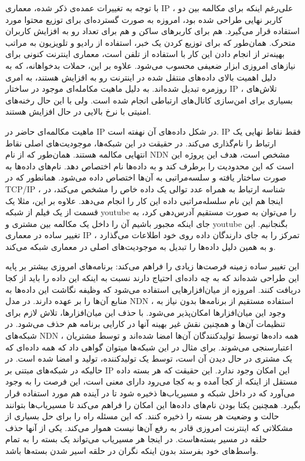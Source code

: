 با توجه به تغییرات عمده‌ی ذکر شده، معماری IP ، علی‌‌رغم اینکه برای مکالمه بین دو کاربر نهایی طراحی شده بود، امروزه به صورت گسترده‌ای برای توزیع محتوا مورد استفاده قرار می‌گیرد. هم برای کاربرهای ساکن و هم برای تعداد رو به افزایش کاربران متحرک. همان‌طور که برای توزیع کردن یک خبر، استفاده از رادیو و تلویزیون به مراتب بهینه‌تر از انجام دادن این کار با استفاده از تلفن است،  معماری اینترنت کنونی برای نیازهای امروزی ابزار ضعیفی محسوب می‌شود. علاوه بر این، حملات بدخواهانه، که به دلیل اهمیت بالای داده‌های منتقل شده در اینترنت رو به افزایش هستند، به امری روزمره تبدیل شده‌اند. به دلیل ماهیت مکامله‌ای موجود در ساختار IP ، تلاش‌های بسیاری برای امن‌سازی کانال‌های ارتباطی انجام شده است. ولی با این حال رخنه‌‌های امنیتی با نرخ بالایی در حال افزایش هستند. 

ماهیت مکالمه‌ای حاضر در IP  در شکل داده‌‌های آن نهفته است. IP فقط نقاط نهایی یک ارتباط را نام‌گذاری می‌کند. در حقیقت در این شبکه‌ها، موجودیت‌های اصلی نقاط انتهایی مکالمه هستند. همان‌طور که از نام NDN مشخص است، هدف این پروژه این است که این محدودیت را برطرف کند و به داده‌ها نام اختصاص دهد. نام‌های داده‌‌ها به صورت  ساختار یافته و سلسه‌مراتبی به آن‌‌ها اختصاص داده می‌شود. همانطور که در TCP/IP ، شناسه ارتباط به همراه عدد توالی یک داده خاص را مشخص می‌کند، در اینجا هم این نام سلسله‌مراتبی داده این کار را انجام می‌دهد. علاوه بر این، مثلا یک قسمت از یک فیلم از شبکه youtube را می‌توان به صورت مستقیم آدرس‌دهی کرد، به جای اینکه مجبور باشیم آن را داخل یک مکالمه بین مشتری و youtube بگنجانیم. این تغییر ساده در معماری IP ، تمرکز را به جای دارندگان داده روی خود اطلاعات می‌گذارد و به همین دلیل داده‌ها را تبدیل به موجودیت‌های اصلی در معماری شبکه می‌کند. 

این تغییر ساده زمینه فرصت‌ها زیادی را فراهم می‌کند:‌
 برنامه‌های امروزی بیشتر بر پایه این طراحی شده‌اند که به چه داده‌ای احتیاج دارند نسبت به اینکه این داده را باید از کجا دریافت کنند. امروزه از میان‌افزارهایی استفاده می‌شود که وظیفه نگاشت این داده‌ها به منابع آن‌ها را بر عهده دارند. در مدل NDN ، استفاده مستقیم از برنامه‌ها بدون نیاز به وجود این میان‌افزارها امکان‌پذیر می‌شود.  با حذف این میان‌افزارها، تلاش لازم برای تنظیمات آن‌ها و همچنین نقش غیر بهینه آنها در کارایی برنامه هم حذف می‌شود.  
 در شبکه‌های NDN ،‌ همه داده‌ها توسط تولیدکنندگان آن‌ها امضا شده‌اند و توسط مشتریان اعتبارسنجی می‌شوند. برای مثال در این شبکه‌ها میتوان گواهی داد که همه داده‌ای که یک مشتری در حال دیدن آن است، توسط یک تولیدکننده، تولید و امضا شده است. در حالیکه در شبکه‌های مبتنی بر IP این امکان وجود ندارد. 
 این حقیقت که هر بسته داده مستقل از اینکه از کجا آمده و به کجا می‌رود دارای معنی است، این فرصت را به وجود می‌آورد که در داخل شبکه و مسیریاب‌ها ذخیره شود تا در آینده هم مورد استفاده قرار بگیرد.  همچنین یکتا بودن نام‌های داده‌ها این امکان را فراهم می‌کند تا مسیریاب‌ها بتوانند حالت و وضعیت هر بسته را ذخیره کنند. که این مسئله راه را برای حل بسیاری از مشکلاتی که اینترنت امروزی قادر به رفع آن‌ها نیست هموار می‌کند. یکی از آنها حذف حلقه در مسیر بسته‌هاست. در اینجا هر مسیریاب می‌تواند یک بسته را به تمام واسط‌های خود بفرستد بدون اینکه نگران در حلقه اسیر شدن بسته‌ها باشد. 

